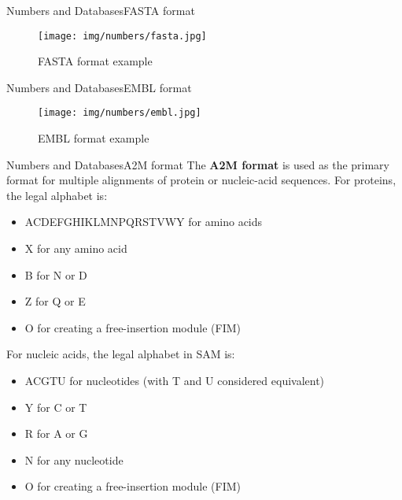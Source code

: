 \documentclass[10pt]{beamer}
\begin{document}
{%
\begin{frame}{Numbers and Databases}{FASTA format}
\begin{figure}[]
 \centering
    \texttt{[image: img/numbers/fasta.jpg]}
    \label{img:mot2}
    \caption{FASTA format example}
\end{figure}
\end{frame}

\begin{frame}{Numbers and Databases}{EMBL format}
\begin{figure}[]
 \centering
    \texttt{[image: img/numbers/embl.jpg]}
    \label{img:mot2}
    \caption{EMBL format example}
\end{figure}
\end{frame}

\begin{frame}{Numbers and Databases}{A2M format}
The \textbf{A2M format} is used as the primary format for multiple alignments of protein or nucleic-acid sequences. For proteins, the legal alphabet is:
\begin{itemize}
    \item  ACDEFGHIKLMNPQRSTVWY for amino acids
    \item  X for any amino acid
    \item  B for N or D
    \item  Z for Q or E
    \item  O for creating a free-insertion module (FIM) 
\end{itemize}

For nucleic acids, the legal alphabet in SAM is:
\begin{itemize}
    \item  ACGTU for nucleotides (with T and U considered equivalent)
    \item  Y for C or T
    \item  R for A or G
    \item  N for any nucleotide
    \item  O for creating a free-insertion module (FIM) 
\end{itemize}
\end{frame}

}
\end{document}
